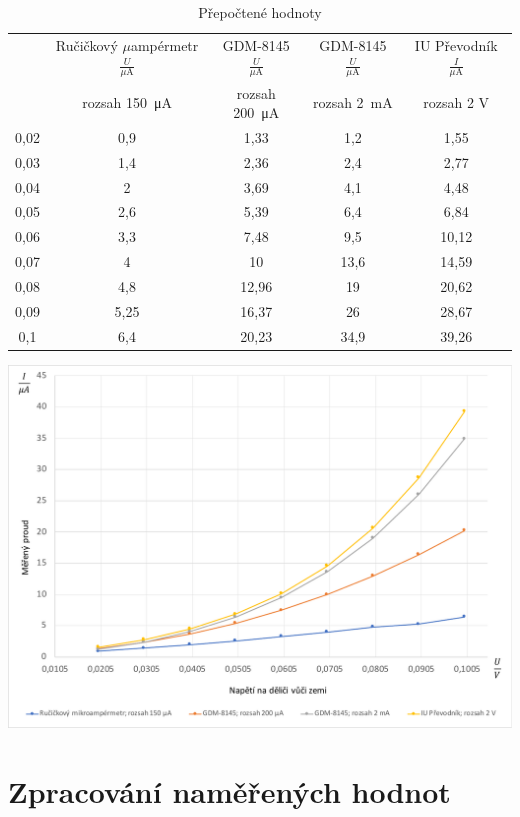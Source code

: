 \documentclass[a4paper,12pt]{article}   %
\newcommand{\tmu}{$\mu$}
\begin{document}
\begin{table}[h!]
    \begin{tabular}{|c|c|c|c|c|}
        \hline
        \rule{0pt}{2.5ex}
        \multirow{2}{*}{Vstupní napětí $\frac{U}{\textrm{V}}$}& Ručičkový \tmu ampérmetr$\frac{U}{\mu\textrm{A}}$ 	&GDM-8145 $\frac{U}{\mu\textrm{A}}$	&GDM-8145 $\frac{U}{\mu\textrm{A}}$	&IU Převodník $\frac{I}{\mu\textrm{A}}$  \\[.7ex]
        & rozsah  150~μA & rozsah 200~μA & rozsah  2~mA & rozsah  2 V\\\hline\hline
        0,02&0,9&1,33&1,2&1,55\\\hline
        0,03&1,4&2,36&2,4&2,77\\\hline
        0,04&2&3,69&4,1&4,48\\\hline
        0,05&2,6&5,39&6,4&6,84\\\hline
        0,06&3,3&7,48&9,5&10,12\\\hline
        0,07&4&10&13,6&14,59\\\hline
        0,08&4,8&12,96&19&20,62\\\hline
        0,09&5,25&16,37&26&28,67\\\hline
        0,1&6,4&20,23&34,9&39,26\\\hline
    \end{tabular}
    \caption{Přepočtené hodnoty}
    \label{tab:prepocteno}
\end{table}

\begin{graf}[h!]
    \centering
    \includegraphics[width=.8\textwidth]{graf_namereno.pdf}
    \caption{Naměřené hodnoty přepočtené na \tmu A}
    \label{graf:hodnoty}
\end{graf}


\section{Zpracování naměřených hodnot}
\end{document}

